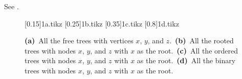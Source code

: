 \exercise
See .
\begin{figure}[htb]
    \subcaptionbox{\label{fig:B.5-1a}}[0.15\textwidth]{{1a.tikz}}
    \subcaptionbox{\label{fig:B.5-1b}}[0.25\textwidth]{{1b.tikz}}
    \subcaptionbox{\label{fig:B.5-1c}}[0.35\textwidth]{{1c.tikz}}
    \subcaptionbox{\label{fig:B.5-1d}}[0.8\textwidth]{{1d.tikz}}
    \caption{\textbf{(a)}\, All the free trees with vertices $x$, $y$, and $z$.\,
    \textbf{(b)}\, All the rooted trees with nodes $x$, $y$, and $z$ with $x$ as the root.\,
    \textbf{(c)}\, All the ordered trees with nodes $x$, $y$, and $z$ with $x$ as the root.\,
    \textbf{(d)}\, All the binary trees with nodes $x$, $y$, and $z$ with $x$ as the root.} \label{fig:B.5-1}
\end{figure}
